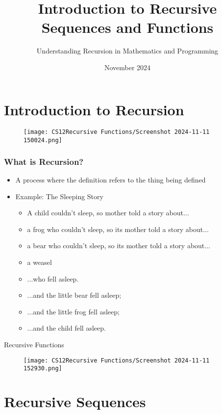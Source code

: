 \documentclass{beamer}
\title[Recursive Sequences \& Functions]{Introduction to Recursive Sequences and Functions}
\subtitle{Understanding Recursion in Mathematics and Programming}
\author[Mr. Gullo]{}
\date[Nov 2024]{November 2024}
\begin{document}
\frame{\titlepage}

\section{Introduction to Recursion}


\begin{frame}
\begin{figure}
    \centering
    \texttt{[image: CS12Recursive Functions/Screenshot 2024-11-11 150024.png]}
\end{figure}
    
\end{frame}

\begin{frame}
\frametitle{What is Recursion?}
\begin{itemize}
    \item A process where the definition refers to the thing being defined
    \item Example: The Sleeping Story
    \begin{itemize}
        \item A child couldn't sleep, so mother told a story about...
        \item a frog who couldn't sleep, so its mother told a story about...
        \item a bear who couldn't sleep, so its mother told a story about...
        \item a weasel
        \item ...who fell asleep.
        \item ...and the little bear fell asleep;
        \item ...and the little frog fell asleep;
        \item...and the child fell asleep.
    \end{itemize}
\end{itemize}
\end{frame}
\begin{frame}{Recursive Functions}
\begin{figure}
    \centering
    \texttt{[image: CS12Recursive Functions/Screenshot 2024-11-11 152930.png]}
\end{figure}
    
\end{frame}
\section{Recursive Sequences}
\end{document}
